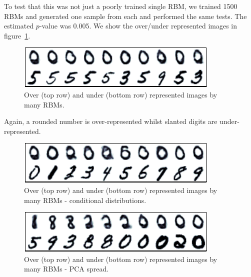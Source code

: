 \documentclass{article}
\begin{document}
To test that this was not just a poorly trained single RBM, we trained 1500 RBMs and generated one sample from each and performed the same tests.
The estimated $p$-value was 0.005.
We show the over/under represented images in figure~\ref{fig:many_rbm_over_under}.

\begin{figure}[ht]
\centering
\includegraphics[width=0.98\columnwidth]{figures/many_rbm_over_under}
\caption{
Over (top row) and under (bottom row) represented images by many RBMs.
}
\label{fig:many_rbm_over_under}
\end{figure}

Again, a rounded number is over-represented whilst slanted digits are under-represented.

\begin{figure}[ht]
\centering
\includegraphics[width=0.98\columnwidth]{figures/many_rbm_over_under_digit}
\caption{
Over (top row) and under (bottom row) represented images by many RBMs - conditional distributions.
}
\label{fig:many_rbm_over_under_digit}
\end{figure}


\begin{figure}[ht]
\centering
\includegraphics[width=0.98\columnwidth]{figures/many_rbm_over_under_pca}
\caption{
Over (top row) and under (bottom row) represented images by many RBMs - PCA spread.
}
\label{fig:many_rbm_over_under_pca}
\end{figure}
\end{document}
